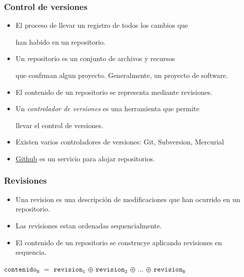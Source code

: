 \documentclass{beamer}
\begin{document}
\begin{frame}

\frametitle{Control de versiones}

\begin{itemize}

    \item{El proceso de llevar un registro de todos los cambios que 

    han habido en un repositorio.}

    \item{Un {\emph repositorio} es un conjunto de archivos y recursos

    que confrman algun proyecto. Generalmente, un proyecto de software.}

    \item{El contenido de un repositorio se representa mediante revisiones.}

    \item{Un \emph{controlador de versiones} es una herramienta que permite

    llevar el control de versiones.}

    \item{Existen varios controladores de versiones: Git, Subversion, Mercurial}

    \item{\href{https://github.com/}{Github} es un servicio para alojar repositorios.}

\end{itemize}

\end{frame}



\begin{frame}

\frametitle{Revisiones}

\begin{itemize}

    \item Una revision es una descripci\'on de modificaciones que han ocurrido en un repositorio.

    \item Las revisiones estan ordenadas sequencialmente.

    \item El contenido de un repositorio se construcye aplicando revisiones en sequencia.

\end{itemize}

\begin{center}

$\mathtt{contenido_N}$ $=$ $\mathtt{revision_1}$ $\oplus$ $\mathtt{revision_2}$ $\oplus$ ... $\oplus$ $\mathtt{revision_N}$

\end{center}

\end{frame}
\end{document}
